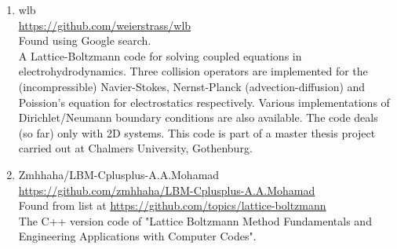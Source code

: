\documentclass{article}
\begin{document}
\begin{enumerate}
	\item wlb
	\\
	\href{https://github.com/weierstrass/wlb}{https://github.com/weierstrass/wlb}
	\\
	Found using Google search.\\
	A Lattice-Boltzmann code for solving coupled equations in electrohydrodynamics. 
	Three collision operators are implemented for the (incompressible) Navier-Stokes, 
	Nernst-Planck (advection-diffusion) and Poission's equation for electrostatics 
	respectively. Various implementations of Dirichlet/Neumann boundary conditions 
	are also available. The code deals (so far) only with 2D systems.
	This code is part of a  master thesis project carried out at Chalmers University, 
	Gothenburg.
	
	\item Zmhhaha/LBM-Cplusplus-A.A.Mohamad
	\\
	\href{https://github.com/zmhhaha/LBM-Cplusplus-A.A.Mohamad}{https://github.com/zmhhaha/LBM-Cplusplus-A.A.Mohamad} \\
	Found from list at \href{https://github.com/topics/lattice-boltzmann}{https://github.com/topics/lattice-boltzmann}\\
	The C++ version code of "Lattice Boltzmann Method Fundamentals and Engineering Applications with Computer Codes".
	
\end{enumerate}
\end{document}
